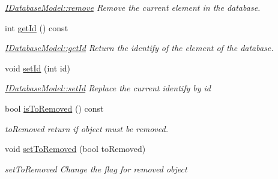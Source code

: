 \begin{DoxyCompactItemize}
\begin{DoxyCompactList}\small\item\em \hyperlink{classIDatabaseModel_a11d94697daf0af2b44fbe37ef831ea94}{I\+Database\+Model\+::remove} Remove the current element in the database. \end{DoxyCompactList}\item 
int \hyperlink{classIDatabaseModel_a61523b015ec148d4e68ee8054c2ad3e3}{get\+Id} () const 
\begin{DoxyCompactList}\small\item\em \hyperlink{classIDatabaseModel_a61523b015ec148d4e68ee8054c2ad3e3}{I\+Database\+Model\+::get\+Id} Return the identify of the element of the database. \end{DoxyCompactList}\item 
void \hyperlink{classIDatabaseModel_ad4f47f3e25302c506ce98103e616ca57}{set\+Id} (int id)
\begin{DoxyCompactList}\small\item\em \hyperlink{classIDatabaseModel_ad4f47f3e25302c506ce98103e616ca57}{I\+Database\+Model\+::set\+Id} Replace the current identify by {\itshape id} \end{DoxyCompactList}\item 
bool \hyperlink{classIDatabaseModel_a095166b2e37a0d07c4151a25ddbd89f9}{is\+To\+Removed} () const 
\begin{DoxyCompactList}\small\item\em to\+Removed return if object must be removed. \end{DoxyCompactList}\item 
void \hyperlink{classIDatabaseModel_a6c7d03b37e11a287dfe97a2e7bc12522}{set\+To\+Removed} (bool to\+Removed)
\begin{DoxyCompactList}\small\item\em set\+To\+Removed Change the flag for removed object \end{DoxyCompactList}\end{DoxyCompactItemize}
